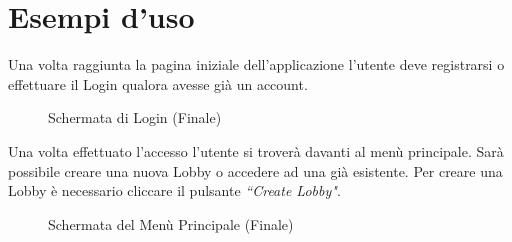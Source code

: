 \section{Esempi d'uso}
Una volta raggiunta la pagina iniziale dell'applicazione l'utente deve registrarsi o effettuare il Login qualora avesse già un account.

\begin{figure}[H]
    \caption{Schermata di Login (Finale)}
    \centering
    \label{fig:login_screen}
\end{figure}

\noindent Una volta effettuato l'accesso l'utente si troverà davanti al menù principale. Sarà possibile creare una nuova Lobby o accedere ad una già esistente. Per creare una Lobby è necessario cliccare il pulsante \textit{``Create Lobby"}.

\begin{figure}[H]
    \caption{Schermata del Menù Principale (Finale)}
    \centering
    \label{fig:menu_screen}
\end{figure}

